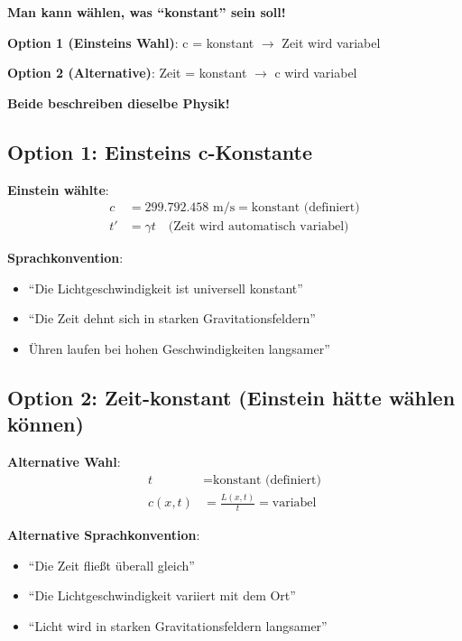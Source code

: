 	\begin{tcolorbox}[colback=orange!5!white,colframe=orange!75!black,title=Die fundamentale Wahlmöglichkeit]
		\textbf{Man kann wählen, was ``konstant'' sein soll!}
		
		\textbf{Option 1 (Einsteins Wahl)}: c = konstant $\rightarrow$ Zeit wird variabel
		
		\textbf{Option 2 (Alternative)}: Zeit = konstant $\rightarrow$ c wird variabel
		
		\textbf{Beide beschreiben dieselbe Physik!}
	\end{tcolorbox}
	
	\subsection{Option 1: Einsteins c-Konstante}
	
	\textbf{Einstein wählte}:
	\begin{align}
		c &= 299.792.458 \text{ m/s} = \text{konstant (definiert)} \\
		t' &= \gamma t \quad \text{(Zeit wird automatisch variabel)}
	\end{align}
	
	\textbf{Sprachkonvention}:
	\begin{itemize}
		\item ``Die Lichtgeschwindigkeit ist universell konstant''
		\item ``Die Zeit dehnt sich in starken Gravitationsfeldern''
		\item Ühren laufen bei hohen Geschwindigkeiten langsamer''
	\end{itemize}
	
	\subsection{Option 2: Zeit-konstant (Einstein hätte wählen können)}
	
	\textbf{Alternative Wahl}:
	\begin{align}
		t &= \text{konstant (definiert)} \\
		c(x,t) &= \frac{L(x,t)}{t} = \text{variabel}
	\end{align}
	
	\textbf{Alternative Sprachkonvention}:
	\begin{itemize}
		\item ``Die Zeit fließt überall gleich''
		\item ``Die Lichtgeschwindigkeit variiert mit dem Ort''
		\item ``Licht wird in starken Gravitationsfeldern langsamer''
	\end{itemize}
	
